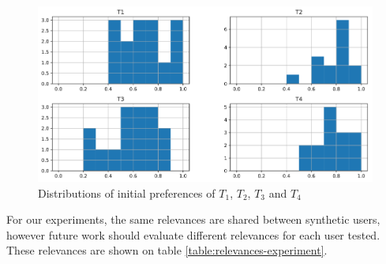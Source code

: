 \begin{figure}[h]
    \centering
    \includegraphics[scale=0.25]{tourist_histogram.png}
    \caption{Distributions of initial preferences of $T_1$, $T_2$, $T_3$ and $T_4$}
    \label{fig:tourist_hist} 
\end{figure}

For our experiments, the same relevances are shared between synthetic users, however future work should evaluate different relevances for each user tested. These relevances are shown on table \ref{table:relevances-experiment}.

